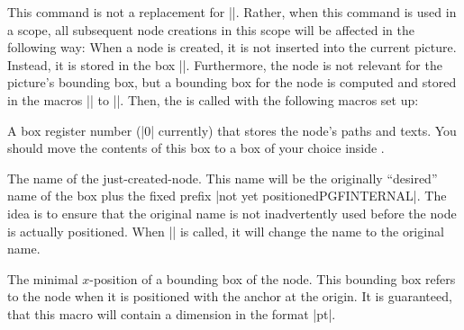 \begin{command}{\pgfpositionnodelater{}}
    This command is not a replacement for |\pgfnode|. Rather, when this command
    is used in a scope, all subsequent node creations in this scope will be
    affected in the following way: When a node is created, it is not inserted
    into the current picture. Instead, it is stored in the box
    |\pgfpositionnodelaterbox|. Furthermore, the node is not relevant for the
    picture's bounding box, but a bounding box for the node is computed and
    stored in the macros |\pgfpositionnodelaterminx| to
    |\pgfpositionnodelatermaxy|. Then, the  is called with the
    following macros set up:

    \begin{command}{\pgfpositionnodelaterbox}
        A box register number (|0| currently) that stores the node's paths and
        texts. You should move the contents of this box to a box of your choice
        inside .
    \end{command}

    \begin{command}{\pgfpositionnodelatername}
        The name of the just-created-node. This name will be the originally
        ``desired'' name of the box plus the fixed prefix
        |not yet positionedPGFINTERNAL|. The idea is to ensure that the
        original name is not inadvertently used before the node is actually
        positioned. When |\pgfpositionnodenow| is called, it will change the
        name to the
        original name.
    \end{command}

    \begin{command}{\pgfpositionnodelaterminx}
        The minimal $x$-position of a bounding box of the node. This bounding
        box refers to the node when it is positioned with the anchor at the
        origin. It is guaranteed, that this macro will contain a dimension in
        the format |pt|.
    \end{command}
    \begin{command}{\pgfpositionnodelaterminy}
    \end{command}
    \begin{command}{\pgfpositionnodelatermaxx}
    \end{command}
    \begin{command}{\pgfpositionnodelatermaxy}
    \end{command}


\end{command}
